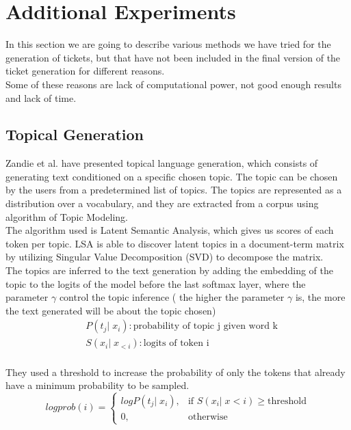 \section{Additional Experiments}

In this section we are going to describe various methods we have tried for the generation of tickets, but that have not been included in the final version of the ticket generation for different reasons. \\
Some of these reasons are lack of computational power, not good enough results and lack of time. \\

\subsection{Topical Generation}
Zandie et al.\cite{zandie2021topical} have presented topical language generation, which consists of generating text conditioned on a specific chosen topic. The topic can be chosen by the users from a predetermined list of topics. The topics are represented as a distribution over a vocabulary, and they are extracted from a corpus using algorithm of Topic Modeling. \\
The algorithm used is Latent Semantic Analysis, which gives us scores of each token per topic. LSA is able to discover latent topics in a document-term matrix by utilizing Singular Value Decomposition (SVD) to decompose the matrix. \\
The topics are inferred to the text generation by adding the embedding of the topic to the logits of the model before the last softmax layer, where the parameter $\gamma$ control the topic inference ( the higher the parameter $\gamma$ is, the more the text generated will be about the topic chosen)
\begin{equation*}
    \begin{split}
        & P(t_j|\;x_i): \text{probability of topic j given word k} \\
        & S(x_i|\;x_{<i}): \text{logits of token i} \\
    \end{split}    
\end{equation*}

They used a threshold to increase the probability of only the tokens that already have a minimum probability to be sampled.
\begin{equation*}
        logprob(i) = 
        \begin{cases}
            logP(t_j|\;x_i),& \text{if } S(x_i|\;x<i)\geq \text{threshold}\\
            0,              & \text{otherwise}
        \end{cases}
\end{equation*}

